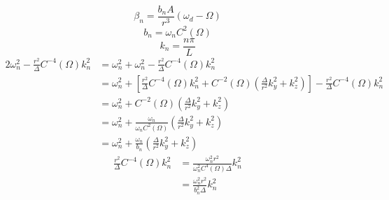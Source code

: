 \documentclass[english]{article}
\begin{document}
 {}
\[
\beta_{n}=\frac{b_{n}A}{r^{3}}\left(\omega_{d}-\Omega\right)
\]
 {}
\[
b_{n}=\omega_{n}C^{2}\left(\Omega\right)
\]
 {}
\[
k_{n}=\frac{n\pi}{L}
\]
 {}
\begin{align*}
2\omega^{2}_{n}-\frac{r^{2}}{\Delta}C^{-4}\left(\Omega\right)k^{2}_{n} & =\omega^{2}_{n}+\omega^{2}_{n}-\frac{r^{2}}{\Delta}C^{-4}\left(\Omega\right)k^{2}_{n}\\
 & =\omega^{2}_{n}+\left[\frac{r^{2}}{\Delta}C^{-4}\left(\Omega\right)k^{2}_{n}+C^{-2}\left(\Omega\right)\left(\frac{\Delta}{r^{2}}k^{2}_{y}+k^{2}_{z}\right)\right]-\frac{r^{2}}{\Delta}C^{-4}\left(\Omega\right)k^{2}_{n}\\
 & =\omega^{2}_{n}+C^{-2}\left(\Omega\right)\left(\frac{\Delta}{r^{2}}k^{2}_{y}+k^{2}_{z}\right)\\
 & =\omega^{2}_{n}+\frac{\omega_{n}}{\omega_{n}C^{2}\left(\Omega\right)}\left(\frac{\Delta}{r^{2}}k^{2}_{y}+k^{2}_{z}\right)\\
 & =\omega^{2}_{n}+\frac{\omega_{n}}{b_{n}}\left(\frac{\Delta}{r^{2}}k^{2}_{y}+k^{2}_{z}\right)
\end{align*}
 {}
\begin{align*}
\frac{r^{2}}{\Delta}C^{-4}\left(\Omega\right)k^{2}_{n} & =\frac{\omega^{2}_{n}r^{2}}{\omega^{2}_{n}C^{4}\left(\Omega\right)\Delta}k^{2}_{n}\\
 & =\frac{\omega^{2}_{n}r^{2}}{b^{2}_{n}\Delta}k^{2}_{n}
\end{align*}
\end{document}
